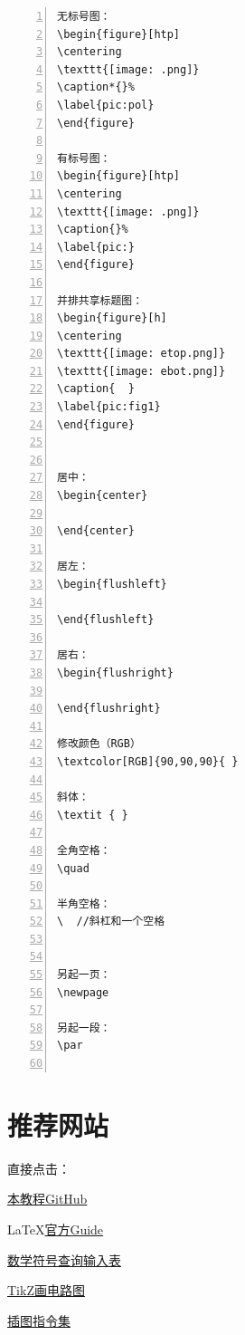 \documentclass[12pt,a4paper,oneside]{book}
\begin{document}
{\begin{lstlisting}[language={[ANSI]C}, numbers=left, numberstyle=\tiny, keywordstyle=\color{blue!70},  frame=shadowbox, rulesepcolor=\color{red!20!green!20!blue!20}]
无标号图：
\begin{figure}[htp] 
\centering 
\texttt{[image: .png]}
\caption*{}%
\label{pic:pol}
\end{figure}

有标号图：
\begin{figure}[htp] 
\centering 
\texttt{[image: .png]}
\caption{}%
\label{pic:}
\end{figure}

并排共享标题图：
\begin{figure}[h]
\centering
\texttt{[image: etop.png]}
\texttt{[image: ebot.png]}
\caption{  }
\label{pic:fig1}
\end{figure}


居中：
\begin{center}

\end{center}

居左：
\begin{flushleft}

\end{flushleft}

居右：
\begin{flushright}

\end{flushright}

修改颜色（RGB）
\textcolor[RGB]{90,90,90}{ }

斜体：
\textit { }

全角空格：
\quad 

半角空格：
\  //斜杠和一个空格


另起一页：
\newpage

另起一段：
\par


\end{lstlisting}
\par
\chapter{推荐网站}
直接点击：
\par
\href{https://github.com/ayucapal/ins_LaTeX.git}{本教程GitHub}
\par

\LaTeX \href{http://www.codecogs.com/latex/eqneditor.php}{官方Guide}
\par
\href{https://openclassrooms.com/forum/sujet/formulaire-de-formules-latex-84687}{数学符号查询输入表}
\par
\href{http://home.deib.polimi.it/mredaelli/circuitikz/index.html}{TikZ画电路图}
\par
\href{http://www.ctex.org/documents/latex/graphics/node20.html}{插图指令集}
\par

}
\end{document}
